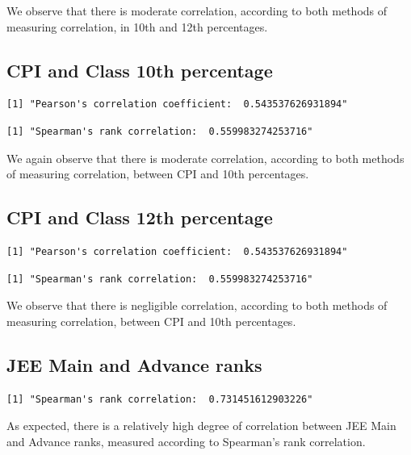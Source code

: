 \documentclass[
  letterpaper,
  DIV=11,
  numbers=noendperiod]{scrartcl}
\begin{document}
We observe that there is moderate correlation, according to both methods
of measuring correlation, in 10th and 12th percentages.

\hypertarget{cpi-and-class-10th-percentage}{%
\subsection{CPI and Class 10th
percentage}\label{cpi-and-class-10th-percentage}}

\begin{verbatim}
[1] "Pearson's correlation coefficient:  0.543537626931894"
\end{verbatim}

\begin{verbatim}
[1] "Spearman's rank correlation:  0.559983274253716"
\end{verbatim}

We again observe that there is moderate correlation, according to both
methods of measuring correlation, between CPI and 10th percentages.

\hypertarget{cpi-and-class-12th-percentage}{%
\subsection{CPI and Class 12th
percentage}\label{cpi-and-class-12th-percentage}}

\begin{verbatim}
[1] "Pearson's correlation coefficient:  0.543537626931894"
\end{verbatim}

\begin{verbatim}
[1] "Spearman's rank correlation:  0.559983274253716"
\end{verbatim}

We observe that there is negligible correlation, according to both
methods of measuring correlation, between CPI and 10th percentages.

\hypertarget{jee-main-and-advance-ranks}{%
\subsection{JEE Main and Advance
ranks}\label{jee-main-and-advance-ranks}}

\begin{verbatim}
[1] "Spearman's rank correlation:  0.731451612903226"
\end{verbatim}

As expected, there is a relatively high degree of correlation between
JEE Main and Advance ranks, measured according to Spearman's rank
correlation.
\end{document}
